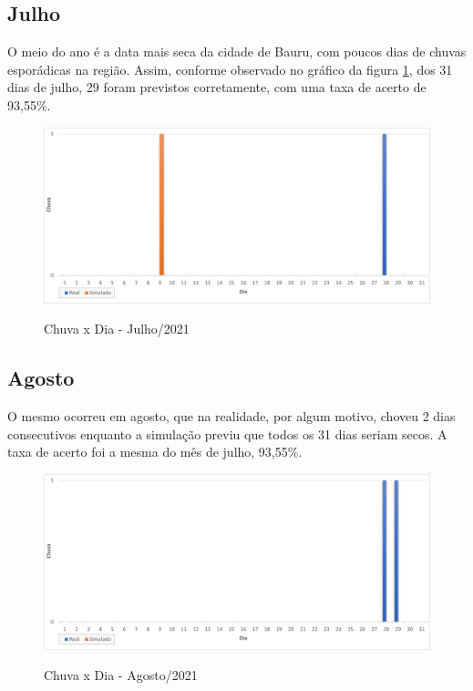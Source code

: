 \subsection{Julho}
O meio do ano é a data mais seca da cidade de Bauru, com poucos dias de chuvas esporádicas na região. Assim, conforme observado no gráfico da figura \ref{f.rjul}, dos 31 dias de julho, 29 foram previstos corretamente, com uma taxa de acerto de 93,55\%.
\begin{figure}[H]
	\caption{\small Chuva x Dia - Julho/2021}
	\centering
	\includegraphics[width=\textwidth]{figs/jul.png}
	\label{f.rjul}
\end{figure}

\subsection{Agosto}
O mesmo ocorreu em agosto, que na realidade, por algum motivo, choveu 2 dias consecutivos enquanto a simulação previu que todos os 31 dias seriam secos. A taxa de acerto foi a mesma do mês de julho, 93,55\%.
\begin{figure}[H]
	\caption{\small Chuva x Dia - Agosto/2021}
	\centering
	\includegraphics[width=\textwidth]{figs/ago.png}
	\label{f.rago}
\end{figure}

